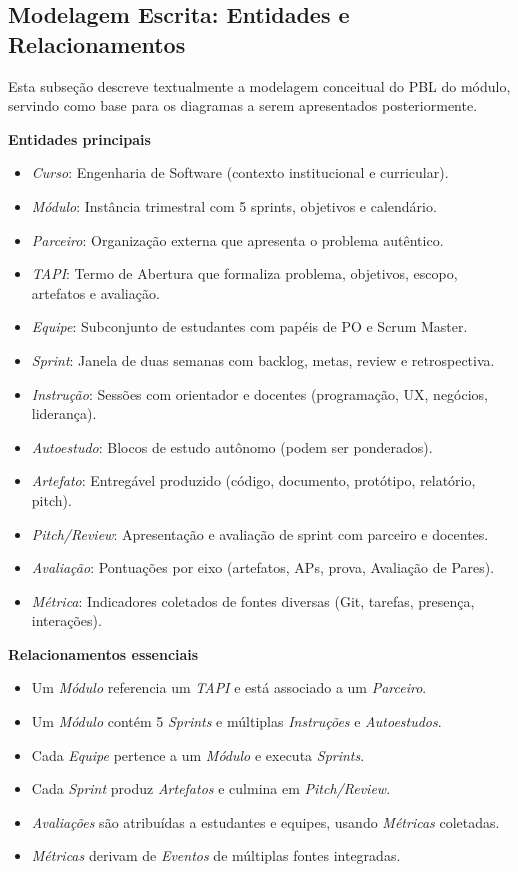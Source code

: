 \documentclass[12pt,a4paper]{article}
\begin{document}
\subsection{Modelagem Escrita: Entidades e Relacionamentos}

Esta subseção descreve textualmente a modelagem conceitual do PBL do módulo,
servindo como base para os diagramas a serem apresentados posteriormente.

\textbf{Entidades principais}

\begin{itemize}
  \item \textit{Curso}: Engenharia de Software (contexto institucional e curricular).
  \item \textit{Módulo}: Instância trimestral com 5 sprints, objetivos e calendário.
  \item \textit{Parceiro}: Organização externa que apresenta o problema autêntico.
  \item \textit{TAPI}: Termo de Abertura que formaliza problema, objetivos, escopo, artefatos e avaliação.
  \item \textit{Equipe}: Subconjunto de estudantes com papéis de PO e Scrum Master.
  \item \textit{Sprint}: Janela de duas semanas com backlog, metas, review e retrospectiva.
  \item \textit{Instrução}: Sessões com orientador e docentes (programação, UX, negócios, liderança).
  \item \textit{Autoestudo}: Blocos de estudo autônomo (podem ser ponderados).
  \item \textit{Artefato}: Entregável produzido (código, documento, protótipo, relatório, pitch).
  \item \textit{Pitch/Review}: Apresentação e avaliação de sprint com parceiro e docentes.
  \item \textit{Avaliação}: Pontuações por eixo (artefatos, APs, prova, Avaliação de Pares).
  \item \textit{Métrica}: Indicadores coletados de fontes diversas (Git, tarefas, presença, interações).
\end{itemize}

\textbf{Relacionamentos essenciais}

\begin{itemize}
  \item Um \textit{Módulo} referencia um \textit{TAPI} e está associado a um \textit{Parceiro}.
  \item Um \textit{Módulo} contém 5 \textit{Sprints} e múltiplas \textit{Instruções} e \textit{Autoestudos}.
  \item Cada \textit{Equipe} pertence a um \textit{Módulo} e executa \textit{Sprints}.
  \item Cada \textit{Sprint} produz \textit{Artefatos} e culmina em \textit{Pitch/Review}.
  \item \textit{Avaliações} são atribuídas a estudantes e equipes, usando \textit{Métricas} coletadas.
  \item \textit{Métricas} derivam de \textit{Eventos} de múltiplas fontes integradas.
\end{itemize}
\end{document}
